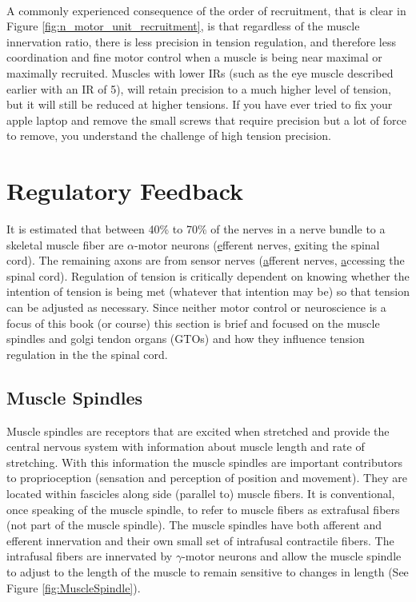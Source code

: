 \paragraph{}

A commonly experienced consequence of the order of recruitment, that is clear in Figure \ref{fig:n_motor_unit_recruitment}, is that regardless of the muscle innervation ratio, there is less precision in tension regulation, and therefore less coordination and fine motor control when a muscle is being near maximal or maximally recruited. Muscles with lower IRs (such as the eye muscle described earlier with an IR of 5), will retain precision to a much higher level of tension, but it will still be reduced at higher tensions. If you have ever tried to fix your apple laptop and remove the small screws that require precision but a lot of force to remove, you understand the challenge of high tension precision.

\section{Regulatory Feedback}

It is estimated that between 40\% to 70\% of the nerves in a nerve bundle to a skeletal muscle fiber are $\alpha$-motor neurons (\underline{e}fferent nerves, \underline{e}xiting the spinal cord). The remaining axons are from sensor nerves (\underline{a}fferent nerves, \underline{a}ccessing the spinal cord). Regulation of tension is critically dependent on knowing whether the intention of tension is being met (whatever that intention may be) so that tension can be adjusted as necessary. Since neither motor control or neuroscience is a focus of this book (or course) this section is brief and focused on the muscle spindles and golgi tendon organs (GTOs) and how they influence tension regulation in the the spinal cord. 

\subsection{Muscle Spindles}

Muscle spindles are receptors that are excited when stretched and provide the central nervous system with information about muscle length and rate of stretching. With this information the muscle spindles are important contributors to proprioception (sensation and perception of position and movement). They are located within fascicles along side (parallel to) muscle fibers. It is conventional, once speaking of the muscle spindle, to refer to muscle fibers as extrafusal fibers (not part of the muscle spindle). The muscle spindles have both afferent and efferent innervation and their own small set of intrafusal contractile fibers. The intrafusal fibers are innervated by $\gamma$-motor neurons and allow the muscle spindle to adjust to the length of the muscle to remain sensitive to changes in length (See Figure \ref{fig:MuscleSpindle}). 

